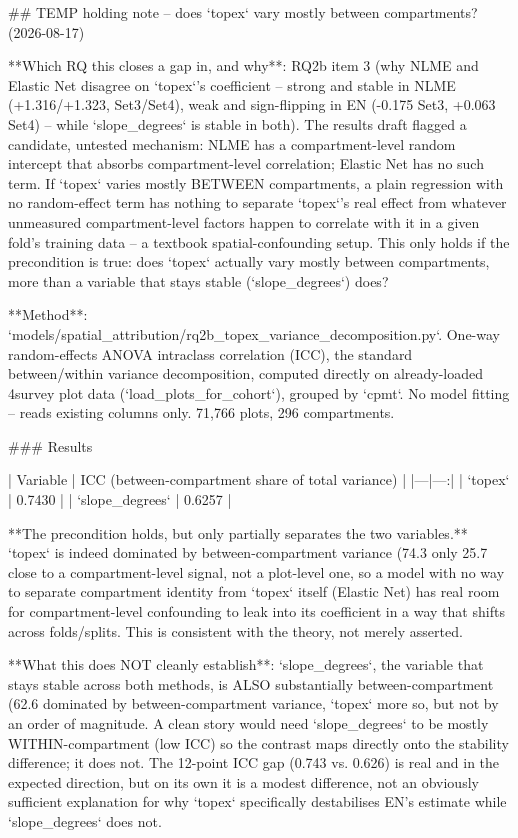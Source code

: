 ## TEMP holding note -- does `topex` vary mostly between compartments? (2026-08-17)

**Which RQ this closes a gap in, and why**: RQ2b item 3 (why NLME and Elastic Net disagree on
`topex`'s coefficient -- strong and stable in NLME (+1.316/+1.323, Set3/Set4), weak and
sign-flipping in EN (-0.175 Set3, +0.063 Set4) -- while `slope_degrees` is stable in both). The
results draft flagged a candidate, untested mechanism: NLME has a compartment-level random
intercept that absorbs compartment-level correlation; Elastic Net has no such term. If `topex`
varies mostly BETWEEN compartments, a plain regression with no random-effect term has nothing to
separate `topex`'s real effect from whatever unmeasured compartment-level factors happen to
correlate with it in a given fold's training data -- a textbook spatial-confounding setup. This
only holds if the precondition is true: does `topex` actually vary mostly between compartments,
more than a variable that stays stable (`slope_degrees`) does?

**Method**: `models/spatial_attribution/rq2b_topex_variance_decomposition.py`. One-way
random-effects ANOVA intraclass correlation (ICC), the standard between/within variance
decomposition, computed directly on already-loaded 4survey plot data (`load_plots_for_cohort`),
grouped by `cpmt`. No model fitting -- reads existing columns only. 71,766 plots, 296
compartments.

### Results

| Variable | ICC (between-compartment share of total variance) |
|---|---:|
| `topex` | 0.7430 |
| `slope_degrees` | 0.6257 |

**The precondition holds, but only partially separates the two variables.** `topex` is indeed
dominated by between-compartment variance (74.3%
only 25.7%
close to a compartment-level signal, not a plot-level one, so a model with no way to separate
compartment identity from `topex` itself (Elastic Net) has real room for compartment-level
confounding to leak into its coefficient in a way that shifts across folds/splits. This is
consistent with the theory, not merely asserted.

**What this does NOT cleanly establish**: `slope_degrees`, the variable that stays stable across
both methods, is ALSO substantially between-compartment (62.6%
dominated by between-compartment variance, `topex` more so, but not by an order of magnitude.
A clean story would need `slope_degrees` to be mostly WITHIN-compartment (low ICC) so the
contrast maps directly onto the stability difference; it does not. The 12-point ICC gap
(0.743 vs. 0.626) is real and in the expected direction, but on its own it is a modest
difference, not an obviously sufficient explanation for why `topex` specifically destabilises EN's
estimate while `slope_degrees` does not.

